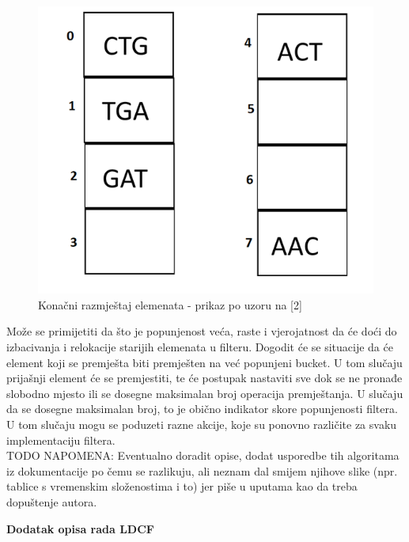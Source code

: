 \documentclass[times, utf8, seminar, numeric]{fer}
\begin{document}
\begin{figure}[H]
  \centering
  \setlength{\intextsep}{5pt}
  \includegraphics[scale = 0.4]{images/finalalign.png}
  \caption{Konačni razmještaj elemenata - prikaz po uzoru na [2]}
  \label{fig_finalalign}
\end{figure}

Može se primijetiti da što je popunjenost veća, raste i vjerojatnost da će doći do izbacivanja i relokacije starijih elemenata u filteru. Dogodit će se situacije da će element koji se premješta biti premješten na već popunjeni bucket. U tom slučaju prijašnji element će se premjestiti, te će postupak nastaviti sve dok se ne pronađe slobodno mjesto ili se dosegne maksimalan broj operacija premještanja. U slučaju da se dosegne maksimalan broj, to je obično indikator skore popunjenosti filtera. U tom slučaju mogu se poduzeti razne akcije, koje su ponovno različite za svaku implementaciju filtera. \\

TODO NAPOMENA: Eventualno doradit opise, dodat usporedbe tih algoritama iz dokumentacije po čemu se razlikuju, ali neznam dal smijem njihove slike (npr. tablice s vremenskim složenostima i to) jer piše u uputama kao da treba dopuštenje autora. 



\begin{flushleft}
\textbf{Dodatak opisa rada LDCF}
\end{flushleft}
\end{document}

